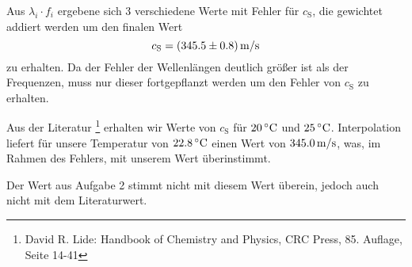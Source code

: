 Aus $\lambda_i \cdot f_i$ ergebene sich 3 verschiedene Werte mit Fehler für $c_\mathrm{S}$, die gewichtet addiert werden um den finalen Wert
\[
	c_\mathrm{S} = \unit[(345.5 \pm 0.8)]{m/s}
\]
zu erhalten.
Da der Fehler der Wellenlängen deutlich größer ist als der Frequenzen, muss nur dieser fortgepflanzt werden um den Fehler von $c_\mathrm{S}$ zu erhalten. 


Aus der Literatur%
\footnote{David R. Lide: Handbook of Chemistry and Physics, CRC Press, 85. Auflage, Seite 14-41}
erhalten wir Werte von $c_\mathrm{S}$ für $\unit[20]{ ^\circ C}$ und $\unit[25]{ ^\circ C}$. Interpolation liefert für unsere Temperatur von $\unit[22.8]{ ^\circ C}$ einen Wert von $\unit[345.0]{m/s}$, was, im Rahmen des Fehlers, mit unserem Wert überinstimmt.

Der Wert aus Aufgabe 2 stimmt nicht mit diesem Wert überein, jedoch auch nicht mit dem Literaturwert.

